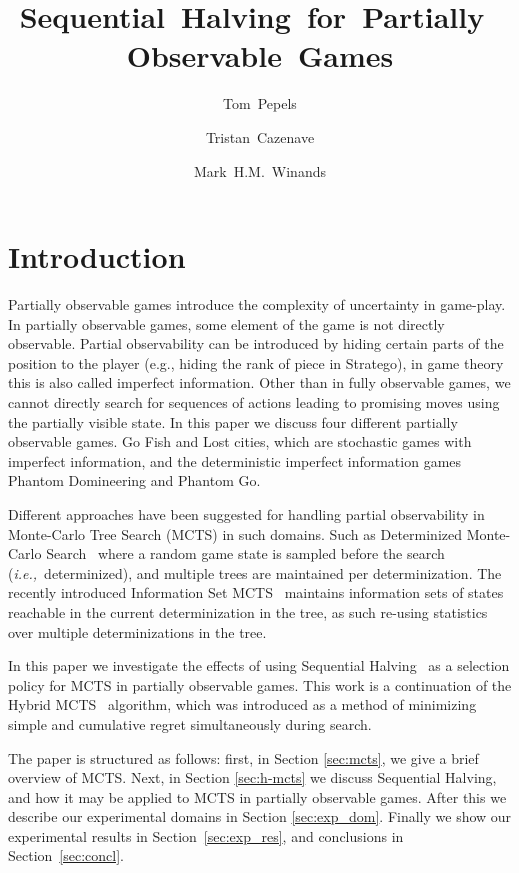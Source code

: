 \documentclass[a4paper]{llncs}
\title{Sequential~Halving~for~Partially~Observable~Games}
\author{Tom~Pepels\inst{1} \and Tristan~Cazenave\inst{2} \and Mark~H.M.~Winands\inst{1}}
\institute{Department of Knowledge Engineering,  Maastricht University\\ \email{\{tom.pepels,m.winands\}@maastrichtuniversity.nl} \and LAMSADE - Université Paris-Dauphine \\ \email{cazenave@lamsade.dauphine.fr}}
\newcommand{\ie}{{\it i.e.,}~}
\begin{document}
\maketitle

\begin{abstract} 

\end{abstract}

\section{Introduction}
\label{sec:intro}

Partially observable games introduce the complexity of uncertainty in game-play. In partially observable games, some element of the game is not directly observable. Partial observability can be introduced by hiding certain parts of the  position to the player (e.g., hiding the rank of piece in Stratego), in game theory this is also called imperfect information. Other than in fully observable games, we cannot directly search for sequences of actions leading to promising moves using the partially visible state. In this paper we discuss four different partially observable games. Go Fish and Lost cities, which are stochastic games with imperfect information, and the deterministic imperfect information games Phantom Domineering and Phantom Go.

Different approaches have been suggested for handling partial observability in Monte-Carlo Tree Search (MCTS) in such domains. Such as Determinized Monte-Carlo Search~\cite{ginsberg99} where a random game state is sampled before the search (\ie determinized), and multiple trees are maintained per determinization. The recently introduced Information Set MCTS~\cite{cowling2012} maintains information sets of states reachable in the current determinization in the tree, as such re-using statistics over multiple determinizations in the tree.

In this paper we investigate the effects of using Sequential Halving~\cite{Karnin13SH} as a selection policy for MCTS in partially observable games. This work is a continuation of the Hybrid MCTS~\cite{Pepels14hmcts} algorithm, which was introduced as a method of minimizing simple and cumulative regret simultaneously during search.

The paper is structured as follows: first, in Section \ref{sec:mcts}, we give a brief overview of MCTS. Next, in Section \ref{sec:h-mcts} we discuss Sequential Halving, and how it may be applied to MCTS in partially observable games. After this we describe our experimental domains in Section \ref{sec:exp_dom}. Finally we show our experimental results in Section~\ref{sec:exp_res}, and conclusions in Section~\ref{sec:concl}.
\end{document}
